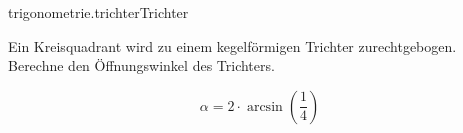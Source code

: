\begin{exercise}{trigonometrie.trichter}{Trichter}
  \ifproblem\problem\par
    Ein Kreisquadrant wird zu einem kegelförmigen Trichter zurechtgebogen.
    Berechne den Öffnungswinkel des Trichters.
  \fi
  \ifoutline\outline\par
    \begin{equation*}
      \alpha=2\cdot\arcsin\left(\frac{1}{4}\right)
    \end{equation*}
  \fi
\end{exercise}
